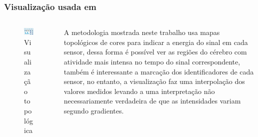 \begin{frame}
	\frametitle{Visualização usada em \cite{9098189}}
	\begin{columns}
		\begin{column}{0.5\textwidth}
			\begin{figure}
				\centering
				\includegraphics[width=\linewidth]{images/visu01}
				\caption{Visualização topológica}
				\label{fig:visu01}
			\end{figure}
		\end{column}
		\begin{column}{0.5\textwidth}
			\par A metodologia mostrada neste trabalho usa mapas topológicos de cores para indicar a energia do sinal em cada sensor, dessa forma é possível ver as regiões do cérebro com atividade mais intensa no tempo do sinal correspondente, também é interessante a marcação dos identificadores de cada sensor, no entanto, a visualização faz uma interpolação dos valores medidos levando a uma interpretação não necessariamente verdadeira de que as intensidades variam segundo gradientes. 
		\end{column}
	\end{columns}
\end{frame}
